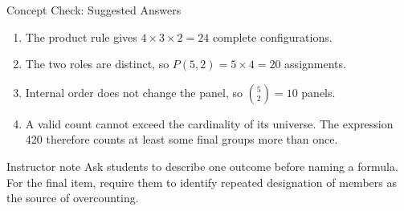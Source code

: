 \documentclass[aspectratio=169,10pt,english]{beamer}
\begin{document}
\appendix

\begin{frame}{Concept Check: Suggested Answers}
  \begin{enumerate}
    \item The product rule gives $4\times3\times2=24$ complete configurations.
    \item The two roles are distinct, so $P(5,2)=5\times4=20$ assignments.
    \item Internal order does not change the panel, so $\binom{5}{2}=10$
      panels.
    \item A valid count cannot exceed the cardinality of its universe. The
      expression 420 therefore counts at least some final groups more than
      once.
  \end{enumerate}

  \begin{block}{Instructor note}
    Ask students to describe one outcome before naming a formula. For the
    final item, require them to identify repeated designation of members as
    the source of overcounting.
  \end{block}
\end{frame}
\end{document}
